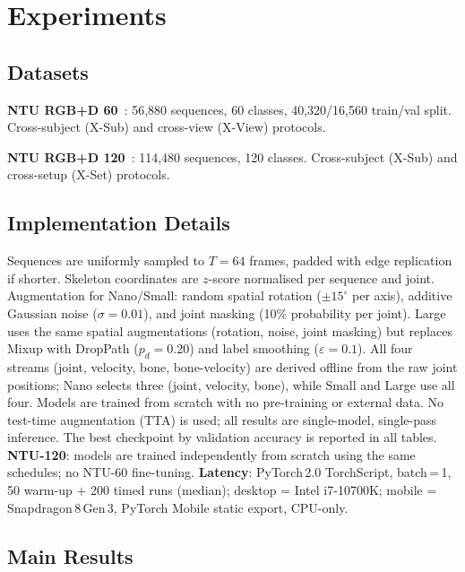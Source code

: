 \documentclass[sigconf,screen,review,anonymous]{acmart}
\begin{document}
\section{Experiments}\label{sec:exp}

\subsection{Datasets}

\textbf{NTU RGB+D 60}~\cite{ntu60}: 56,880 sequences, 60 classes,
40,320/16,560 train/val split.
Cross-subject (X-Sub) and cross-view (X-View) protocols.

\textbf{NTU RGB+D 120}~\cite{ntu120}: 114,480 sequences, 120 classes.
Cross-subject (X-Sub) and cross-setup (X-Set) protocols.

\subsection{Implementation Details}

Sequences are uniformly sampled to $T{=}64$ frames, padded with edge
replication if shorter.
Skeleton coordinates are $z$-score normalised per sequence and joint.
Augmentation for Nano/Small: random spatial rotation ($\pm15^\circ$
per axis), additive Gaussian noise ($\sigma{=}0.01$), and joint masking
(10\% probability per joint).
Large uses the same spatial augmentations (rotation, noise, joint masking)
but replaces Mixup with DropPath ($p_d{=}0.20$) and label smoothing
($\varepsilon{=}0.1$).
All four streams (joint, velocity, bone, bone-velocity) are derived
offline from the raw joint positions; Nano selects three (joint, velocity, bone),
while Small and Large use all four.
Models are trained from scratch with no pre-training or external data.
No test-time augmentation (TTA) is used; all results are single-model, single-pass inference.
The best checkpoint by validation accuracy is reported in all tables.
\textbf{NTU-120}: models are trained independently from scratch using the same
schedules; no NTU-60 fine-tuning.
\textbf{Latency}: PyTorch\,2.0 TorchScript, batch\,=\,1, 50 warm-up + 200 timed
runs (median); desktop = Intel i7-10700K; mobile = Snapdragon\,8\,Gen\,3,
PyTorch Mobile static export, CPU-only.

\subsection{Main Results}
\end{document}
